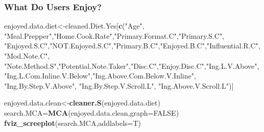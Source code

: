 \documentclass[
]{article}
\newenvironment{Shaded}{\begin{snugshade}}{\end{snugshade}}
\newcommand{\CommentTok}[1]{\textcolor[rgb]{0.56,0.35,0.01}{\textit{#1}}}
\newcommand{\DataTypeTok}[1]{\textcolor[rgb]{0.13,0.29,0.53}{#1}}
\newcommand{\KeywordTok}[1]{\textcolor[rgb]{0.13,0.29,0.53}{\textbf{#1}}}
\newcommand{\NormalTok}[1]{#1}
\newcommand{\OperatorTok}[1]{\textcolor[rgb]{0.81,0.36,0.00}{\textbf{#1}}}
\newcommand{\OtherTok}[1]{\textcolor[rgb]{0.56,0.35,0.01}{#1}}
\newcommand{\StringTok}[1]{\textcolor[rgb]{0.31,0.60,0.02}{#1}}
\begin{document}
\begin{Shaded}
\end{Shaded}

\hypertarget{what-do-users-enjoy-1}{%
\subsubsection{What Do Users Enjoy?}\label{what-do-users-enjoy-1}}

\begin{Shaded}
\begin{Highlighting}[]
\NormalTok{enjoyed.data.diet<-cleaned.Diet.Yes[}\KeywordTok{c}\NormalTok{(}\StringTok{"Age"}\NormalTok{, }\StringTok{"Meal.Prepper"}\NormalTok{,}\StringTok{"Home.Cook.Rate"}\NormalTok{,}\StringTok{"Primary.Format.C"}\NormalTok{,}\StringTok{"Primary.S.C"}\NormalTok{,}
            \StringTok{"Enjoyed.S.C"}\NormalTok{,}\StringTok{"NOT.Enjoyed.S.C"}\NormalTok{,}\StringTok{"Primary.B.C"}\NormalTok{,}\StringTok{"Enjoyed.B.C"}\NormalTok{,}\StringTok{"Influential.R.C"}\NormalTok{, }
            \StringTok{"Mod.Note.C"}\NormalTok{, }
            \StringTok{"Note.Method.S"}\NormalTok{,}\StringTok{"Potential.Note.Taker"}\NormalTok{,}\StringTok{"Disc.C"}\NormalTok{,}\StringTok{"Enjoy.Disc.C"}\NormalTok{,}\StringTok{"Ing.L.V.Above"}\NormalTok{,}
            \StringTok{"Ing.L.Com.Inline.V.Below"}\NormalTok{,}\StringTok{"Ing.Above.Com.Below.V.Inline"}\NormalTok{,  }\StringTok{"Ing.By.Step.V.Above"}\NormalTok{,  }\StringTok{"Ing.By.Step.V.Scroll.L"}\NormalTok{,}
            \StringTok{"Ing.Above.V.Scroll.L"}\NormalTok{)]}

\NormalTok{enjoyed.data.clean<-}\KeywordTok{cleaner.S}\NormalTok{(enjoyed.data.diet)}
\NormalTok{search.MCA=}\KeywordTok{MCA}\NormalTok{(enjoyed.data.clean,}\DataTypeTok{graph=}\OtherTok{FALSE}\NormalTok{)}
\KeywordTok{fviz_screeplot}\NormalTok{(search.MCA,}\DataTypeTok{addlabels=}\NormalTok{T)}
\end{Highlighting}
\end{Shaded}
\end{document}
